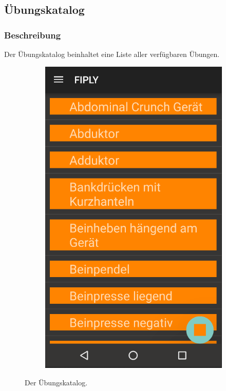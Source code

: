 \documentclass[FIPLY_base.tex]{subfiles}
\begin{document}
\subsection{Übungskatalog}

\subsubsection{Beschreibung}
Der Übungskatalog beinhaltet eine Liste aller verfügbaren Übungen.

\begin{figure}[H]
	\begin{subfigure}[b]{0.3\textwidth}
	\includegraphics[scale=0.4]{img/Uebungskatalog}
	\end{subfigure}
	\hfil
	\caption{Der Übungskatalog.}
\end{figure}
\end{document}
